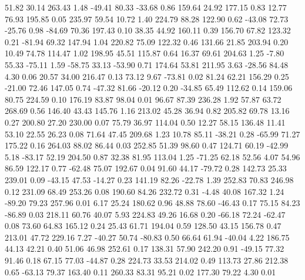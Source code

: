    51.82   30.14  263.43    1.48
  -49.41   80.33  -33.68    0.86
  159.64   24.92  177.15    0.83
   12.77   76.93  195.85    0.05
  235.97   59.54   10.72    1.40
  224.79   88.28  122.90    0.62
  -43.08   72.73  -25.76    0.98
  -84.69   70.36  197.43    0.10
   38.35   44.92  160.11    0.39
  156.70   67.82  123.32    0.21
  -81.94   69.32  147.94    1.04
  220.82   75.09  122.32    0.46
  131.66   21.85  203.94    0.20
   10.49   74.78  114.47    1.02
  198.95   45.51  115.87    0.64
   16.37   69.61  204.63    1.25
   -7.80   55.33  -75.11    1.59
  -58.75   33.13  -53.90    0.71
  174.64   53.81  211.95    3.63
  -28.56   84.48    4.30    0.06
   20.57   34.00  216.47    0.13
   73.12    9.67  -73.81    0.02
   81.24   62.21  156.29    0.25
  -21.00   72.46  147.05    0.74
  -47.32   81.66  -20.12    0.20
  -34.85   65.49  112.62    0.14
  159.06   80.75  224.59    0.10
  176.19   83.87   98.04    0.01
   96.67   87.39  236.28    1.92
   57.87   63.72  268.69    0.56
  146.40   43.43  145.76    1.16
  213.02   45.28   36.94    0.82
  205.82   69.78   13.16    0.27
  200.80   27.20  230.00    0.07
   75.79   36.97  114.04    0.50
   12.27   58.15  136.48   11.41
   53.10   22.55   26.23    0.08
   71.64   47.45  209.68    1.23
   10.78   85.11  -38.21    0.28
  -65.99   71.27  175.22    0.16
  264.03   88.02   86.44    0.03
  252.85   51.39   98.60    0.47
  124.71   60.19  -42.99    5.18
  -83.17   52.19  204.50    0.87
   32.38   81.95  113.04    1.25
  -71.25   62.18   52.56    4.07
   54.96   86.59  122.17    0.77
  -62.48   75.07  192.67    0.04
   91.60   44.17  -79.72    0.28
  142.73   25.33  239.01    0.09
  -43.15   47.53  -14.27    0.23
  141.19   82.26  -22.78    1.39
  252.83   70.83  246.98    0.12
  231.09   68.49  253.26    0.08
  190.60   84.26  232.72    0.31
   -4.48   40.08  167.32    1.24
  -89.20   79.23  257.96    0.01
    6.17   25.24  180.62    0.96
   48.88   78.60  -46.43    0.17
   75.15   84.23  -86.89    0.03
  218.11   60.76   40.07    5.93
  224.83   49.26   16.68    0.20
  -66.18   72.24  -62.47    0.08
   73.60   64.83  165.12    0.24
   25.43   61.71  194.04    0.59
  128.50   43.15  156.78    0.47
  213.01   47.72  229.16    7.27
  -40.27   50.74  -80.83    0.50
   66.64   61.94  -40.04    4.22
  186.75   44.13   42.21    0.40
   51.06   46.98  252.61    0.17
  138.31   57.90  242.20    0.91
  -49.15   77.32   91.46    0.18
   67.15   77.03  -44.87    0.28
  224.73   33.53  214.02    0.49
  113.73   27.86  212.38    0.65
  -63.13   79.37  163.40    0.11
  260.33   83.31   95.21    0.02
  177.30   79.22    4.30    0.01
